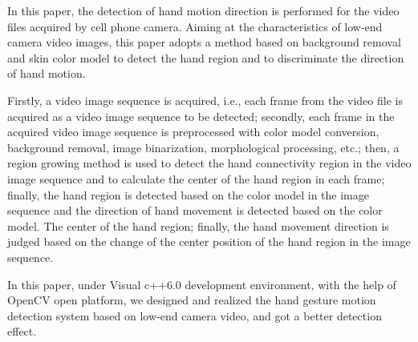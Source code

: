 
{ %

In this paper, the detection of hand motion direction is performed for the video files acquired by cell phone camera. Aiming at the characteristics of low-end camera video images, this paper adopts a method based on background removal and skin color model to detect the hand region and to discriminate the direction of hand motion.

Firstly, a video image sequence is acquired, i.e., each frame from the video file is acquired as a video image sequence to be detected; secondly, each frame in the acquired video image sequence is preprocessed with color model conversion, background removal, image binarization, morphological processing, etc.; then, a region growing method is used to detect the hand connectivity region in the video image sequence and to calculate the center of the hand region in each frame; finally, the hand region is detected based on the color model in the image sequence and the direction of hand movement is detected based on the color model. The center of the hand region; finally, the hand movement direction is judged based on the change of the center position of the hand region in the image sequence.

In this paper, under Visual c++6.0 development environment, with the help of OpenCV open platform, we designed and realized the hand gesture motion detection system based on low-end camera video, and got a better detection effect.

} 